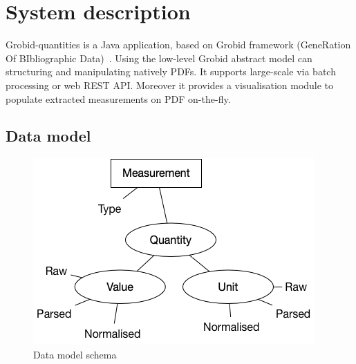 \documentclass[sigconf]{acmart}
\begin{document}
\section{System description}
\label{sec:system}
Grobid-quantities is a Java application, based on Grobid framework (GeneRation Of BIbliographic Data)~\cite{GROBID}. Using the low-level Grobid abstract model can structuring and manipulating natively PDFs. It supports large-scale via batch processing or web REST API. Moreover it provides a visualisation module to populate extracted measurements on PDF on-the-fly.

\subsection{Data model}
\label{subsub:data-model}
\begin{figure}[ht]
  \centering
  \includegraphics[width=\linewidth]{images/schema-2}
  \caption{Data model schema}
  \label{fig:data-model-schema-2}
\end{figure}
\end{document}
